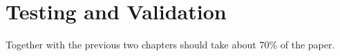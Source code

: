 \chapter{Testing and Validation}
\pagestyle{fancy}

{\noindent\color{blue}Together with the previous two chapters should take about 70\% of the paper.}

